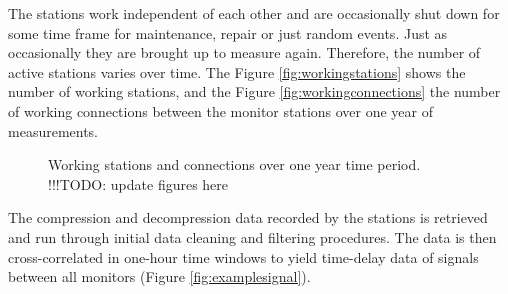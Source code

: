 \documentclass[12pt,a4paper,english]{article}
\newcommand\todo[1]{{\color{red}!!!TODO: #1}}
\begin{document}
The stations work independent of each other and are occasionally shut down for some time frame for maintenance, repair or just random events. Just as occasionally they are brought up to measure again. Therefore, the number of active stations varies over time. The Figure \ref{fig:workingstations} shows the number of working stations, and the Figure \ref{fig:workingconnections} the number of working connections between the monitor stations over one year of measurements. 

\begin{figure}[ht] 
  \centering 
{}
\caption{Working stations and connections over one year time period. \todo{update figures here}}
\label{fig:workingmonitors}
\end{figure}

The compression and decompression data recorded by the stations is retrieved and run through initial data cleaning and filtering procedures. The data is then cross-correlated in one-hour time windows to yield time-delay data of signals between all monitors (Figure \ref{fig:examplesignal}). 

\end{document}
